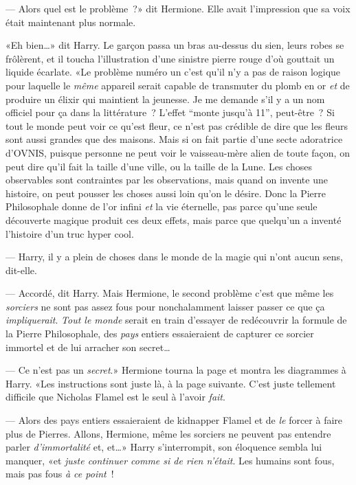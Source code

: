 --- Alors quel est le problème~?» dit Hermione. Elle avait l'impression que sa voix était maintenant plus normale.

«Eh bien…» dit Harry. Le garçon passa un bras au-dessus du sien, leurs robes se frôlèrent, et il toucha l'illustration d'une sinistre pierre rouge d'où gouttait un liquide écarlate. «Le problème numéro un c'est qu'il n'y a pas de raison logique pour laquelle le \emph{même} appareil serait capable de transmuter du plomb en or \emph{et} de produire un élixir qui maintient la jeunesse. Je me demande s'il y a un nom officiel pour ça dans la littérature~? L'effet “monte jusqu'à 11”, peut-être~? Si tout le monde peut voir ce qu'est fleur, ce n'est pas crédible de dire que les fleurs sont aussi grandes que des maisons. Mais si on fait partie d'une secte adoratrice d'OVNIS, puisque personne ne peut voir le vaisseau-mère alien de toute façon, on peut dire qu'il fait la taille d'une ville, ou la taille de la Lune. Les choses observables sont contraintes par les observations, mais quand on invente une histoire, on peut pousser les choses aussi loin qu'on le désire. Donc la Pierre Philosophale donne de l'or infini \emph{et} la vie éternelle, pas parce qu'une seule découverte magique produit ces deux effets, mais parce que quelqu'un a inventé l'histoire d'un truc hyper cool.

--- Harry, il y a plein de choses dans le monde de la magie qui n'ont aucun sens, dit-elle.

--- Accordé, dit Harry. Mais Hermione, le second problème c'est que même les \emph{sorciers} ne sont pas assez fous pour nonchalamment laisser passer ce que ça \emph{impliquerait}. \emph{Tout le monde} serait en train d'essayer de redécouvrir la formule de la Pierre Philosophale, des \emph{pays} entiers essaieraient de capturer ce sorcier immortel et de lui arracher son secret…

--- Ce n'est pas un \emph{secret}.» Hermione tourna la page et montra les diagrammes à Harry. «Les instructions sont juste là, à la page suivante. C'est juste tellement difficile que Nicholas Flamel est le seul à l'avoir \emph{fait}.

--- Alors des pays entiers essaieraient de kidnapper Flamel et de \emph{le} forcer à faire plus de Pierres. Allons, Hermione, même les sorciers ne peuvent pas entendre parler \emph{d'immortalité} et, et…» Harry s'interrompit, son éloquence sembla lui manquer, «et \emph{juste continuer comme si de rien n'était}. Les humains sont fous, mais pas fous \emph{à ce point}~!


